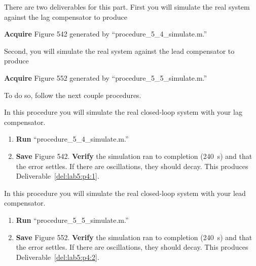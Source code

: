 There are two deliverables for this part.
First you will simulate the real system against the lag compensator to produce
%
\begin{deliverable}[label={del:lab5:p4:1}]
  \textbf{Acquire} Figure 542 generated by ``procedure\_5\_4\_simulate.m.''
\end{deliverable}
%
Second, you will simulate the real system against the lead compensator to produce
%
\begin{deliverable}[label={del:lab5:p4:2}]
  \textbf{Acquire} Figure 552 generated by ``procedure\_5\_5\_simulate.m.''
\end{deliverable}
%
To do so, follow the next couple procedures.
%
\begin{procedure}[label={proc:lab5:4}]
  In this procedure you will simulate the real closed-loop system with your lag compensator.
  \begin{enumerate}[label={(\arabic*)}]
    \item{%
      \textbf{Run} ``procedure\_5\_4\_simulate.m.''
    }
    \item{%
      \textbf{Save} Figure 542.
      \textbf{Verify} the simulation ran to completion (\SI{240}{\second}) and that the error settles.
      If there are oscillations, they should decay.
      This produces Deliverable~\ref{del:lab5:p4:1}.
    }
  \end{enumerate}
\end{procedure}
%
\begin{procedure}[label={proc:lab5:5}]
  In this procedure you will simulate the real closed-loop system with your lead compensator.
  \begin{enumerate}[label={(\arabic*)}]
    \item{%
      \textbf{Run} ``procedure\_5\_5\_simulate.m.''
    }
    \item{%
      \textbf{Save} Figure 552.
      \textbf{Verify} the simulation ran to completion (\SI{240}{\second}) and that the error settles.
      If there are oscillations, they should decay.
      This produces Deliverable~\ref{del:lab5:p4:2}.
    }
  \end{enumerate}
\end{procedure}



